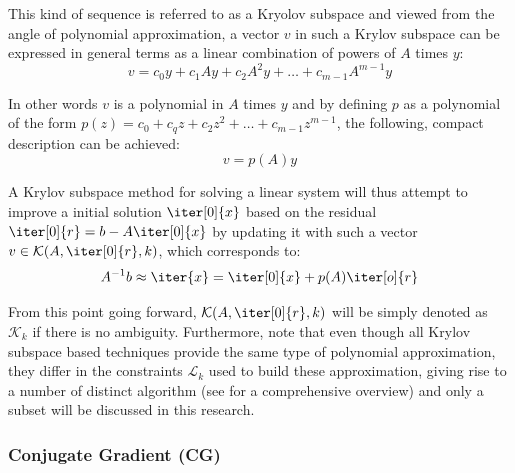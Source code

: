 \noindent This kind of sequence is referred to as a Kryolov subspace and viewed from the angle of polynomial approximation, a vector $v$ in such a Krylov subspace can be expressed in general terms as a linear combination of powers of $A$ times $y$:
\begin{equation}
\label{eqn:poly1}
    v = c_0y+c_1Ay+c_2A^2y+\dots+c_{m-1}A^{m-1}y
\end{equation}

\noindent In other words $v$ is a polynomial in $A$ times $y$ and by defining $p$ as a polynomial of the form $p(z) = c_0+c_qz+c_2z^2+\dots+c_{m-1}z^{m-1}$, the following, compact description can be achieved:
\begin{equation}
\label{eqn:poly2}
v=p(A)y  
\end{equation}

\noindent A Krylov subspace method for solving a linear system will thus attempt to improve a initial solution $\iter[0]{x}$ based on the residual $\iter[0]{r} = b-A\iter[0]{x}$ by updating it with such a vector $v \in \mathcal{K}(A, \iter[0]{r},k)$, which corresponds to:
\begin{equation}
    A^{-1}b \approx \iter{x} = \iter[0]{x}+p(A)\iter[o]{r}
\end{equation}

\noindent From this point going forward, $\mathcal{K}(A, \iter[0]{r},k)$ will be simply denoted as $\mathcal{K}_k$ if there is no ambiguity. Furthermore, note that even though all Krylov subspace based techniques provide the same type of polynomial approximation, they differ in the constraints $\mathcal{L}_k$ used to build these approximation, giving rise to a number of distinct algorithm (see \cite{saad_iterative_2003} for a comprehensive overview) and only a subset will be discussed in this research.



\subsubsection{Conjugate Gradient (CG)}
\label{sec:conjugate_gradient}

